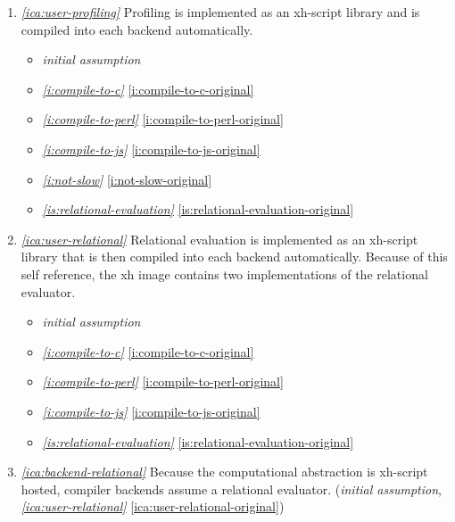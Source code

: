 \documentclass{report}
\makeatletter
\newcommand*{\Label}[2]{%
  \@bsphack
  \begingroup
    \label{#1-original}%
    \def\@currentlabel{#2}%
    \label{#1}%
  \endgroup
  \@esphack
}
\newcommand{\initial}{{\em initial assumption}}
\newcommand{\refboth}[1]{{\em \ref{#1}} \ref{#1-original}}
\makeatother
\begin{document}
\begin{enumerate}
\item{}\Label{ica:user-profiling}{ca.userprofiling}{\em\ref{ica:user-profiling}}
  Profiling is implemented as an xh-script library and is compiled into
  each backend automatically.
\begin{itemize}
\item \initial
\item \refboth{i:compile-to-c}
\item \refboth{i:compile-to-perl}
\item \refboth{i:compile-to-js}
\item \refboth{i:not-slow}
\item \refboth{is:relational-evaluation}
\end{itemize}

\item{}\Label{ica:user-relational}{ca.userrelational}{\em\ref{ica:user-relational}}
  Relational evaluation is implemented as an xh-script library that is then
  compiled into each backend automatically. Because of this self reference,
  the xh image contains two implementations of the relational evaluator.
\begin{itemize}
\item \initial
\item \refboth{i:compile-to-c}
\item \refboth{i:compile-to-perl}
\item \refboth{i:compile-to-js}
\item \refboth{is:relational-evaluation}
\end{itemize}
\item{}\Label{ica:backend-relational}{ca.backendrelational}{\em\ref{ica:backend-relational}}
  Because the computational abstraction is xh-script hosted, compiler
  backends assume a relational evaluator.
(\initial, \refboth{ica:user-relational})


\end{enumerate}
\end{document}
